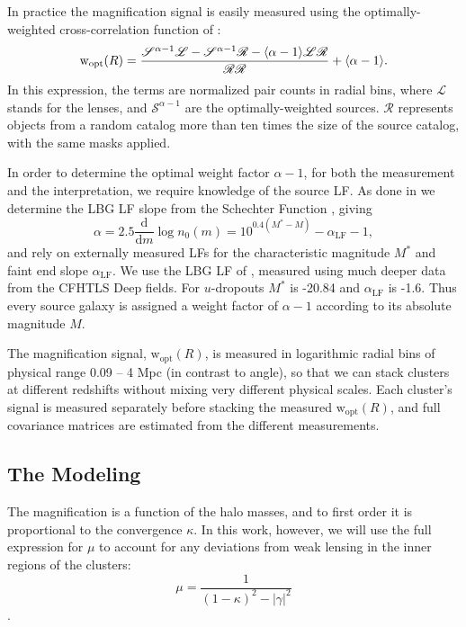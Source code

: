 In practice the magnification signal is easily measured using the optimally-weighted cross-correlation function of \citet{Menard03}:
\begin{equation}
\mathrm{w}_{\rm opt}(R)=\frac{\mathscr{S}^{\alpha-1} \mathscr{L} - \mathscr{S}^{\alpha-1} \mathscr{R} - \langle \alpha-1 \rangle \mathscr{L}\mathscr{R}}{\mathscr{R}\mathscr{R}} + \langle \alpha-1 \rangle .
\end{equation}
In this expression, the terms are normalized pair counts in radial bins, where $\mathscr{L}$ stands for the lenses, and $\mathscr{S}^{\alpha-1}$ are the optimally-weighted sources. $\mathscr{R}$ represents objects from a random catalog more than ten times the size of the source catalog, with the same masks applied.

In order to determine the optimal weight factor $\alpha-1$, for both the measurement and the interpretation, we require knowledge of the source \ac{LF}. As done in \citet{Ford12} we determine the \ac{LBG} \ac{LF} slope from the Schechter Function \citep{Schechter76}, giving
\begin{equation}
\alpha = 2.5 \frac{\mathrm{d}}{\mathrm{d}m}\log n_0(m) = 10^{0.4(M^\ast-M)}-\alpha_{\mathrm{LF}}-1,
\end{equation}
and rely on externally measured \ac{LF}s for the characteristic magnitude $M^\ast$ and faint end slope $\alpha_{\mathrm{LF}}$. We use the \ac{LBG} \ac{LF} of \citet{vanderBurg10}, measured using much deeper data from the \ac{CFHTLS} Deep fields. For $u$-dropouts $M^\ast$ is -20.84 and $\alpha_{\mathrm{LF}}$ is -1.6. Thus every source galaxy is assigned a weight factor of $\alpha-1$ according to its absolute magnitude $M$.

The magnification signal, $\mathrm{w}_{\mathrm{opt}}(R)$, is measured in logarithmic radial bins of physical range 0.09 -- 4 Mpc (in contrast to angle), so that we can stack clusters at different redshifts without mixing very different physical scales. Each cluster's signal is measured separately before stacking the measured $\mathrm{w}_{\mathrm{opt}}(R)$, and full covariance matrices are estimated from the different measurements. 


\subsection{The Modeling}
\label{model}

The magnification is a function of the halo masses, and to first order it is proportional to the convergence $\kappa$. In this work, however, we will use the full expression for $\mu$ to account for any deviations from weak lensing in the inner regions of the clusters:
\begin{equation}
\mu = \frac{1}{(1-\kappa)^2 - \left|\gamma\right|^2}
\end{equation}
\citep{BS01}.

